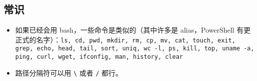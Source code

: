 
\subsection{常识}
\begin{itemize}
\item 如果已经会用 bash，一些命令是类似的（其中许多是 alias，PowerShell 有更正式的名字）：\verb`ls, cd, pwd, mkdir, rm, cp, mv, cat, touch, exit, grep, echo, head, tail, sort, uniq, wc -l, ps, kill, top, uname -a, ping, curl, wget, ifconfig, man, history, clear`
\item 路径分隔符可以用 \verb`\` 或者 \verb`/` 都行。
\end{itemize}

